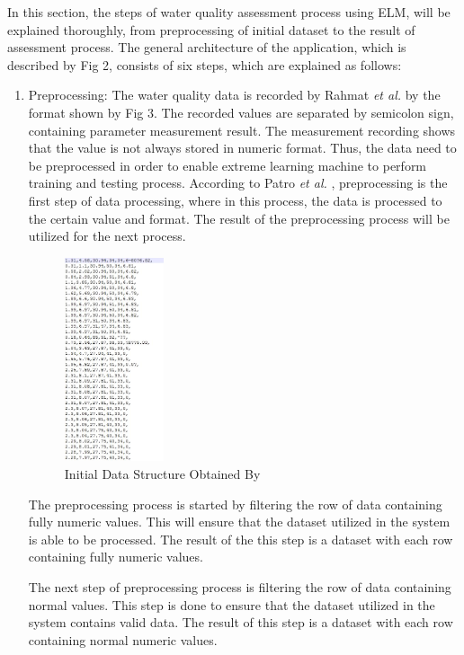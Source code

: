 \documentclass[journal,comsoc]{IEEEtran}
\let\MYoriglatexcaption\caption
\renewcommand{\caption}[2][\relax]{\MYoriglatexcaption[#2]{#2}}
\begin{document}
In this section, the steps of water quality assessment process using ELM, will be explained thoroughly, from preprocessing of initial dataset to the result of assessment process. The general architecture of the application, which is described by Fig 2, consists of six steps, which are explained as follows:

\begin{enumerate}

\item Preprocessing: The water quality data is recorded by Rahmat {\it et al.} \cite{Rahmat16} by the format shown by Fig 3. The recorded values are separated by semicolon sign, containing parameter measurement result. The measurement recording shows that the value is not always stored in numeric format. Thus, the data need to be preprocessed in order to enable extreme learning machine to perform training and testing process. According to Patro {\it et al.} \cite{Patro15} , preprocessing is the first step of data processing, where in this process, the data is processed to the certain value and format. The result of the preprocessing process will be utilized for the next process.

\begin{figure}[th!]
\centering
\includegraphics[width=0.8\columnwidth, height=60mm]{fig-3.jpg}
\caption{Initial Data Structure Obtained By \cite{Rahmat16}}
\label{fig3}
\end{figure}

The preprocessing process is started by filtering the row of data containing fully numeric values. This will ensure that the dataset utilized in the system is able to be processed. The result of the this step is a dataset with each row containing fully numeric values.

The next step of preprocessing process is filtering the row of data containing normal values. This step is done to ensure that the dataset utilized in the system contains valid data. The result of this step is a dataset with each row containing normal numeric values.


\end{enumerate}
\end{document}
